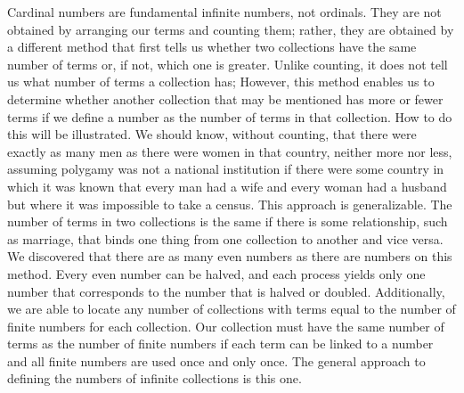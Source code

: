 \documentclass[a4paper,12pt]{book}[2004/02/16]
\theoremstyle{ilemma}
\theoremstyle{itheorem}
\theoremstyle{iother}
\theoremstyle{icorollary}
\theoremstyle{numcorollary}
\theoremstyle{idefinition}
\begin{document}
Cardinal numbers are fundamental infinite numbers, not ordinals. They are not obtained by arranging our terms and counting them; rather, they are obtained by a different method that first tells us whether two collections have the same number of terms or, if not, which one is greater. Unlike counting, it does not tell us what number of terms a collection has; However, this method enables us to determine whether another collection that may be mentioned has more or fewer terms if we define a number as the number of terms in that collection. How to do this will be illustrated. We should know, without counting, that there were exactly as many men as there were women in that country, neither more nor less, assuming polygamy was not a national institution if there were some country in which it was known that every man had a wife and every woman had a husband but where it was impossible to take a census. This approach is generalizable. The number of terms in two collections is the same if there is some relationship, such as marriage, that binds one thing from one collection to another and vice versa. We discovered that there are as many even numbers as there are numbers on this method.
Every even number can be halved, and each process yields only one number that corresponds to the number that is halved or doubled. Additionally, we are able to locate any number of collections with terms equal to the number of finite numbers for each collection. Our collection must have the same number of terms as the number of finite numbers if each term can be linked to a number and all finite numbers are used once and only once. The general approach to defining the numbers of infinite collections is this one.
\end{document}
